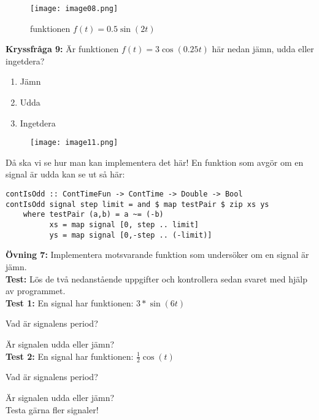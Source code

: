 \documentclass{article}
\begin{document}
\begin{figure}[ht]
\centerline{\texttt{[image: image08.png]}}
\caption{funktionen $f(t) = 0.5 \sin(2t)$}
\label{}
\end{figure}

\newpage

\textbf{Kryssfråga 9:} Är funktionen $f(t)=3\cos(0.25t)$ här nedan jämn, udda eller ingetdera?
\begin{enumerate}[label={\alph*)},font={\bfseries}]
    \item Jämn
    \item Udda
    \item Ingetdera
\end{enumerate}

\begin{figure}[ht]
\centerline{\texttt{[image: image11.png]}}
\caption{}
\label{}
\end{figure}

Då ska vi se hur man kan implementera det här! En funktion som avgör om en
signal är udda kan se ut så här:
\begin{verbatim}
contIsOdd :: ContTimeFun -> ContTime -> Double -> Bool
contIsOdd signal step limit = and $ map testPair $ zip xs ys
    where testPair (a,b) = a ~= (-b)
          xs = map signal [0, step .. limit]
          ys = map signal [0,-step .. (-limit)]
\end{verbatim}

\textbf{Övning 7:} Implementera motsvarande funktion som undersöker
om en signal är jämn.\\

\textbf{Test:} Lös de två nedanstående uppgifter och kontrollera sedan svaret med
hjälp av programmet.\\

\textbf{Test 1:}
En signal har funktionen: $3*\sin(6t)$

Vad är signalens period?

Är signalen udda eller jämn?\\

\textbf{Test 2:}
En signal har funktionen: $\frac{1}{2} \cos(t)$

Vad är signalens period?

Är signalen udda eller jämn?\\

Testa gärna fler signaler!
\end{document}

